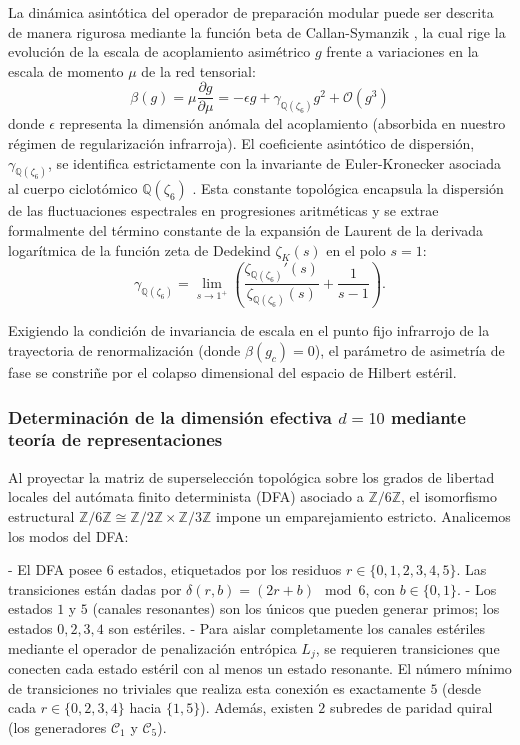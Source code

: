 \documentclass[12pt,a4paper]{article}
\theoremstyle{plain}
\theoremstyle{definition}
\theoremstyle{remark}
\begin{document}
La dinámica asintótica del operador de preparación modular puede ser descrita de manera rigurosa mediante la función beta de Callan-Symanzik \cite{Callan1970}, la cual rige la evolución de la escala de acoplamiento asimétrico $g$ frente a variaciones en la escala de momento $\mu$ de la red tensorial:
\begin{equation}
\beta(g) = \mu \frac{\partial g}{\partial \mu} = -\epsilon g + \gamma_{\mathbb{Q}(\zeta_6)} g^2 + \mathcal{O}(g^3)
\label{eq:beta_function}
\end{equation}
donde $\epsilon$ representa la dimensión anómala del acoplamiento (absorbida en nuestro régimen de regularización infrarroja). El coeficiente asintótico de dispersión, $\gamma_{\mathbb{Q}(\zeta_6)}$, se identifica estrictamente con la invariante de Euler-Kronecker asociada al cuerpo ciclotómico $\mathbb{Q}(\zeta_6)$ \cite{Ihara2006}. Esta constante topológica encapsula la dispersión de las fluctuaciones espectrales en progresiones aritméticas y se extrae formalmente del término constante de la expansión de Laurent de la derivada logarítmica de la función zeta de Dedekind $\zeta_K(s)$ en el polo $s=1$:
\begin{equation}
\gamma_{\mathbb{Q}(\zeta_6)} = \lim_{s\to 1^+} \left( \frac{\zeta_{\mathbb{Q}(\zeta_6)}'(s)}{\zeta_{\mathbb{Q}(\zeta_6)}(s)} + \frac{1}{s-1} \right).
\end{equation}

Exigiendo la condición de invariancia de escala en el punto fijo infrarrojo de la trayectoria de renormalización (donde $\beta(g_c) = 0$), el parámetro de asimetría de fase se constriñe por el colapso dimensional del espacio de Hilbert estéril.

\subsubsection{Determinación de la dimensión efectiva $d=10$ mediante teoría de representaciones}

Al proyectar la matriz de superselección topológica sobre los grados de libertad locales del autómata finito determinista (DFA) asociado a $\mathbb{Z}/6\mathbb{Z}$, el isomorfismo estructural $\mathbb{Z}/6\mathbb{Z} \cong \mathbb{Z}/2\mathbb{Z} \times \mathbb{Z}/3\mathbb{Z}$ impone un emparejamiento estricto. Analicemos los modos del DFA:

- El DFA posee $6$ estados, etiquetados por los residuos $r \in \{0,1,2,3,4,5\}$. Las transiciones están dadas por $\delta(r,b) = (2r + b) \mod 6$, con $b \in \{0,1\}$.
- Los estados $1$ y $5$ (canales resonantes) son los únicos que pueden generar primos; los estados $0,2,3,4$ son estériles.
- Para aislar completamente los canales estériles mediante el operador de penalización entrópica $L_j$, se requieren transiciones que conecten cada estado estéril con al menos un estado resonante. El número mínimo de transiciones no triviales que realiza esta conexión es exactamente $5$ (desde cada $r \in \{0,2,3,4\}$ hacia $\{1,5\}$). Además, existen $2$ subredes de paridad quiral (los generadores $\mathcal{C}_1$ y $\mathcal{C}_5$). 
\end{document}
